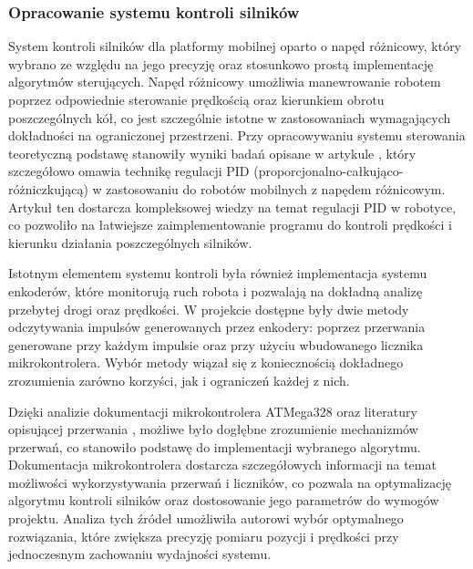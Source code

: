 \subsubsection*{Opracowanie systemu kontroli silników}

System kontroli silników dla platformy mobilnej oparto o napęd różnicowy, który wybrano ze względu na jego precyzję oraz stosunkowo prostą implementację algorytmów sterujących. Napęd różnicowy umożliwia manewrowanie robotem poprzez odpowiednie sterowanie prędkością oraz kierunkiem obrotu poszczególnych kół, co jest szczególnie istotne w zastosowaniach wymagających dokładności na ograniczonej przestrzeni. Przy opracowywaniu systemu sterowania teoretyczną podstawę stanowiły wyniki badań opisane w artykule \cite{bib:konferencja}, który szczegółowo omawia technikę regulacji PID (proporcjonalno-całkująco-różniczkującą) w zastosowaniu do robotów mobilnych z napędem różnicowym. Artykuł ten dostarcza kompleksowej wiedzy na temat regulacji PID w robotyce, co pozwoliło na łatwiejsze zaimplementowanie programu do kontroli prędkości i kierunku działania poszczególnych silników. 

Istotnym elementem systemu kontroli była również implementacja systemu enkoderów, które monitorują ruch robota i pozwalają na dokładną analizę przebytej drogi oraz prędkości. W projekcie dostępne były dwie metody odczytywania impulsów generowanych przez enkodery: poprzez przerwania generowane przy każdym impulsie oraz przy użyciu wbudowanego licznika mikrokontrolera. Wybór metody wiązał się z koniecznością dokładnego zrozumienia zarówno korzyści, jak i ograniczeń każdej z nich.

Dzięki analizie dokumentacji mikrokontrolera ATMega328 \cite{bib:manualarduino} oraz literatury opisującej przerwania \cite{bib:artykul1}, możliwe było dogłębne zrozumienie mechanizmów przerwań, co stanowiło podstawę do implementacji wybranego algorytmu. Dokumentacja mikrokontrolera dostarcza szczegółowych informacji na temat możliwości wykorzystywania przerwań i liczników, co pozwala na optymalizację algorytmu kontroli silników oraz dostosowanie jego parametrów do wymogów projektu. Analiza tych źródeł umożliwiła autorowi wybór optymalnego rozwiązania, które zwiększa precyzję pomiaru pozycji i prędkości przy jednoczesnym zachowaniu wydajności systemu.
